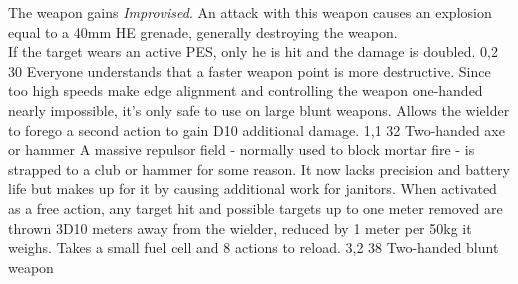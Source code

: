 \begin{multicols}{2}
    {The weapon gains \emph{Improvised}.
        An attack with this weapon causes an explosion equal to a 40mm HE grenade,
        generally destroying the weapon.\\
        If the target wears an active PES,
        only he is hit and the damage is doubled.}
    {0,2}
    {30}
    {}
    {Everyone understands that a faster weapon point is more destructive.
        Since too high speeds make edge alignment and controlling the weapon one-handed nearly impossible,
        it's only safe to use on large blunt weapons.}
    {Allows the wielder to forego a second action to gain D10 additional damage.}
    {1,1}
    {32}
    {Two-handed axe or hammer}
    {A massive repulsor field
        - normally used to block mortar fire
        - is strapped to a club or hammer for some reason.
        It now lacks precision and battery life
        but makes up for it by causing additional work for janitors.}
    {When activated as a free action,
        any target hit and possible targets up to one meter removed
        are thrown 3D10 meters away from the wielder,
        reduced by 1 meter per 50kg it weighs.
        Takes a small fuel cell and 8 actions to reload.}
    {3,2}
    {38}
    {Two-handed blunt weapon}
\end{multicols}
